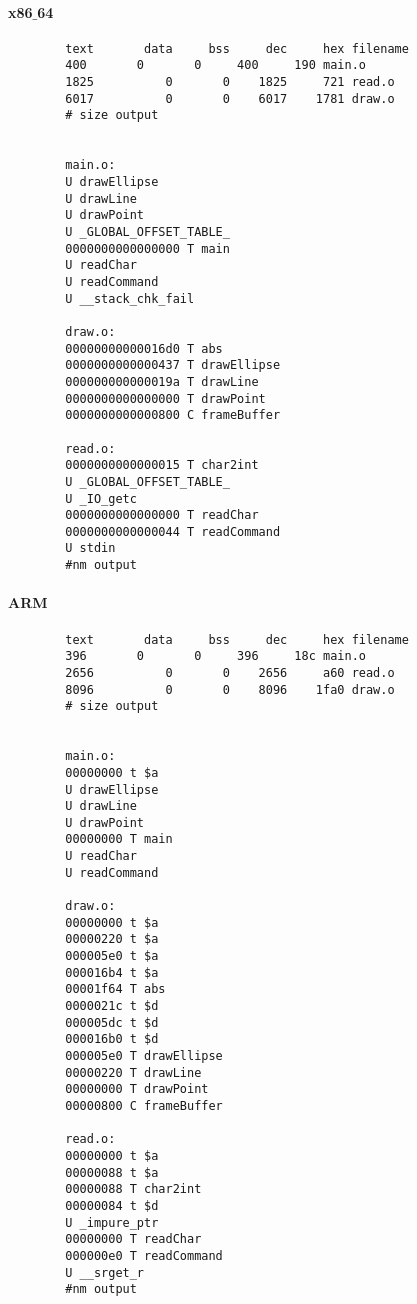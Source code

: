 \documentclass{article}
\begin{document}
		\paragraph{x86$\_$64}
		\begin{center}
		\begin{lstlisting}
		text	   data	    bss	    dec	    hex	filename
		400	      0	      0	    400	    190	main.o
		1825	      0	      0	   1825	    721	read.o
		6017	      0	      0	   6017	   1781	draw.o
		# size output
		
		
		main.o:
		U drawEllipse
		U drawLine
		U drawPoint
		U _GLOBAL_OFFSET_TABLE_
		0000000000000000 T main
		U readChar
		U readCommand
		U __stack_chk_fail
		
		draw.o:
		00000000000016d0 T abs
		0000000000000437 T drawEllipse
		000000000000019a T drawLine
		0000000000000000 T drawPoint
		0000000000000800 C frameBuffer
		
		read.o:
		0000000000000015 T char2int
		U _GLOBAL_OFFSET_TABLE_
		U _IO_getc
		0000000000000000 T readChar
		0000000000000044 T readCommand
		U stdin
		#nm output
		\end{lstlisting}	
		\end{center}
		
		\paragraph{ARM}
		\begin{center}
		\begin{lstlisting}
		text	   data	    bss	    dec	    hex	filename
		396	      0	      0	    396	    18c	main.o
		2656	      0	      0	   2656	    a60	read.o
		8096	      0	      0	   8096	   1fa0	draw.o
		# size output
			
			
		main.o:
		00000000 t $a
		U drawEllipse
		U drawLine
		U drawPoint
		00000000 T main
		U readChar
		U readCommand
			
		draw.o:
		00000000 t $a
		00000220 t $a
		000005e0 t $a
		000016b4 t $a
		00001f64 T abs
		0000021c t $d
		000005dc t $d
		000016b0 t $d
		000005e0 T drawEllipse
		00000220 T drawLine
		00000000 T drawPoint
		00000800 C frameBuffer
		
		read.o:
		00000000 t $a
		00000088 t $a
		00000088 T char2int
		00000084 t $d
		U _impure_ptr
		00000000 T readChar
		000000e0 T readCommand
		U __srget_r
		#nm output
		\end{lstlisting}
		\end{center}
		
\end{document}
